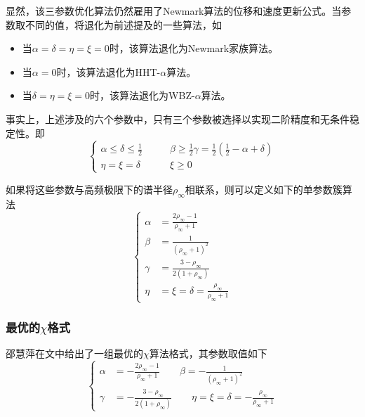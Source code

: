 显然，该三参数优化算法仍然雇用了Newmark算法的位移和速度更新公式。当参数取不同的值，将退化为前述提及的一些算法，如
\begin{itemize}
\item[\ddag] 当$\alpha=\delta=\eta=\xi=0$时，该算法退化为Newmark家族算法。
\item[\ddag] 当$\alpha=0$时，该算法退化为HHT-$\alpha$算法。
\item[\ddag] 当$\delta=\eta=\xi=0$时，该算法退化为WBZ-$\alpha$算法。
\end{itemize}

事实上，上述涉及的六个参数中，只有三个参数被选择以实现二阶精度和无条件稳定性。即
\begin{equation}
\left\{\begin{aligned}
\alpha\le\delta\le\frac{1}{2}&\qquad \beta\ge\frac{1}{2}\gamma=\frac{1}{2}(\frac{1}{2}-\alpha+\delta)\\
\eta=\xi=\delta&\qquad \xi\ge0
\end{aligned}\right.
\end{equation}

如果将这些参数与高频极限下的谱半径$\rho_{\infty}$相联系，则可以定义如下的单参数簇算法
\begin{equation}
\left\{\begin{aligned}
\alpha&=\frac{2\rho_{\infty}-1}{\rho_{\infty}+1}\\
\beta&=\frac{1}{(\rho_{\infty}+1)^2}\\
\gamma&=\frac{3-\rho_{\infty}}{2(1+\rho_{\infty})}\\
\eta&=\xi=\delta=\frac{\rho_{\infty}}{\rho_{\infty}+1}
\end{aligned}\right.
\end{equation}

\subsubsection{最优的$\chi$格式}
邵慧萍在文中给出了一组最优的$\chi$算法格式，其参数取值如下
\begin{equation}
\left\{\begin{aligned}
\alpha&=-\frac{2\rho_{\infty}-1}{\rho_{\infty}+1}\qquad\beta=-\frac{1}{(\rho_{\infty}+1)^2}\\
\gamma&=-\frac{3-\rho_{\infty}}{2(1+\rho_{\infty})}\qquad\eta=\xi=\delta=-\frac{\rho_{\infty}}{\rho_{\infty}+1}
\end{aligned}\right.
\end{equation}

